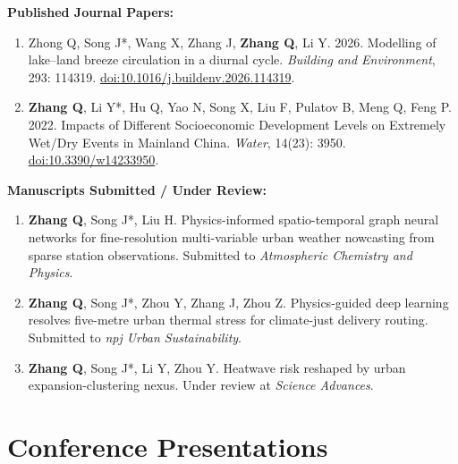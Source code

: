 \documentclass[10pt,a4paper]{article}
\begin{document}
\noindent\textbf{Published Journal Papers:}
\begin{enumerate}[leftmargin=22pt]
    \item Zhong Q, Song J*, Wang X, Zhang J, \textbf{Zhang Q}, Li Y. 2026. Modelling of lake--land breeze circulation in a diurnal cycle. \textit{Building and Environment}, 293: 114319. \href{https://doi.org/10.1016/j.buildenv.2026.114319}{doi:10.1016/j.buildenv.2026.114319}.
    \item \textbf{Zhang Q}, Li Y*, Hu Q, Yao N, Song X, Liu F, Pulatov B, Meng Q, Feng P. 2022. Impacts of Different Socioeconomic Development Levels on Extremely Wet/Dry Events in Mainland China. \textit{Water}, 14(23): 3950. \href{https://doi.org/10.3390/w14233950}{doi:10.3390/w14233950}.
\end{enumerate}

\noindent\textbf{Manuscripts Submitted / Under Review:}
\begin{enumerate}[leftmargin=22pt]
    \item \textbf{Zhang Q}, Song J*, Liu H. Physics-informed spatio-temporal graph neural networks for fine-resolution multi-variable urban weather nowcasting from sparse station observations. Submitted to \textit{Atmospheric Chemistry and Physics}.
    \item \textbf{Zhang Q}, Song J*, Zhou Y, Zhang J, Zhou Z. Physics-guided deep learning resolves five-metre urban thermal stress for climate-just delivery routing. Submitted to \textit{npj Urban Sustainability}.
    \item \textbf{Zhang Q}, Song J*, Li Y, Zhou Y. Heatwave risk reshaped by urban expansion-clustering nexus. Under review at \textit{Science Advances}.
\end{enumerate}

\section{Conference Presentations}
\end{document}
